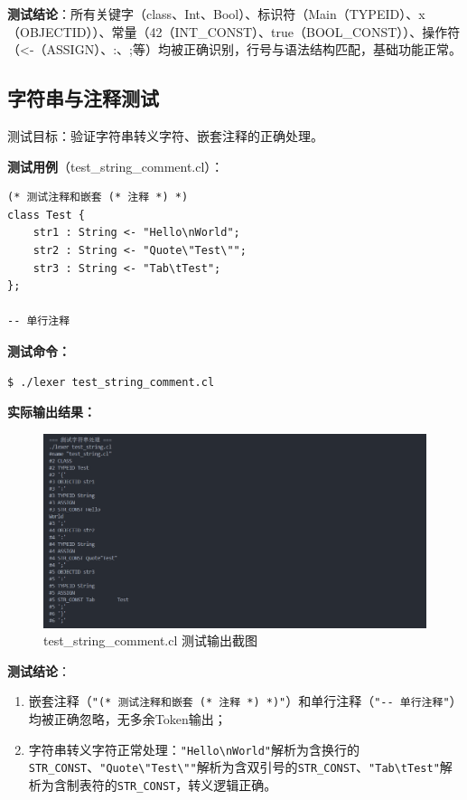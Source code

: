 \documentclass[twocolumn]{article}
\begin{document}
\textbf{测试结论}：所有关键字（class、Int、Bool）、标识符（Main（TYPEID）、x（OBJECTID））、常量（42（INT\_CONST）、true（BOOL\_CONST））、操作符（<-（ASSIGN）、:、;等）均被正确识别，行号与语法结构匹配，基础功能正常。

\subsection{字符串与注释测试}

测试目标：验证字符串转义字符、嵌套注释的正确处理。

\textbf{测试用例}（test\_string\_comment.cl）：
\begin{lstlisting}[language=cool, caption={字符串与注释测试}]
(* 测试注释和嵌套 (* 注释 *) *)
class Test {
    str1 : String <- "Hello\nWorld";
    str2 : String <- "Quote\"Test\"";
    str3 : String <- "Tab\tTest";
};

-- 单行注释
\end{lstlisting}

\textbf{测试命令：}
\begin{verbatim}
$ ./lexer test_string_comment.cl
\end{verbatim}

\textbf{实际输出结果：}
\begin{figure}[H]
    \centering
    \includegraphics[width=\linewidth]{test_string_comment.png}  %
    \caption{test\_string\_comment.cl 测试输出截图}  %
\end{figure}

\textbf{测试结论}：
\begin{enumerate}
    \item 嵌套注释（\verb|"(* 测试注释和嵌套 (* 注释 *) *)"|）和单行注释（\verb|"-- 单行注释"|）均被正确忽略，无多余Token输出；
    
    \item 字符串转义字符正常处理：\verb|"Hello\nWorld"|解析为含换行的\texttt{STR\_CONST}、\verb|"Quote\"Test\""|解析为含双引号的\texttt{STR\_CONST}、\verb|"Tab\tTest"|解析为含制表符的\texttt{STR\_CONST}，转义逻辑正确。
\end{enumerate}
\end{document}
